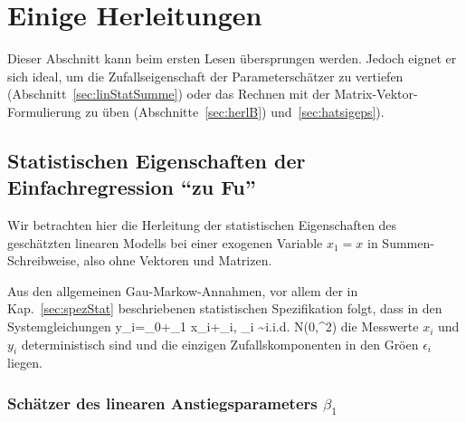 % 


\section{\label{sec:linHerl}Einige Herleitungen}

Dieser Abschnitt kann beim ersten Lesen \"ubersprungen werden. Jedoch
eignet er sich ideal, um die Zufallseigenschaft der
Parametersch\"atzer zu vertiefen (Abschnitt~\ref{sec:linStatSumme})
oder das Rechnen 
 mit der Matrix-Vektor-Formulierung zu \"uben (Abschnitte~\ref{sec:herlB}) 
und~\ref{sec:hatsigeps}).


\subsection{\label{sec:linStatSumme}Statistischen
Eigenschaften der Einfachregression ``zu Fu\3''}

\EinsteinBeg
Wir betrachten hier die Herleitung der statistischen Eigenschaften 
des gesch\"atzten linearen Modells  bei einer exogenen Variable
$x_1=x$ in Summen-Schreibweise, also ohne Vektoren und Matrizen.

Aus den allgemeinen Gau\3-Markow-Annahmen, vor allem der in
Kap.~\ref{sec:spezStat} beschriebenen statistischen
Spezifikation folgt, dass in den Systemgleichungen
\be
\label{linSysUni}
y_i=\beta_0+\beta_1 x_i+\epsilon_i, \quad \epsilon_i \sim i.i.d. N(0,\sigeps^2)
\ee
die Messwerte $x_i$ und $y_i$ deterministisch sind und die einzigen
Zufallskomponenten in den Gr\"o\3en $\epsilon_i$ liegen.


\subsubsection{Sch\"atzer des linearen Anstiegsparameters $\beta_1$}

